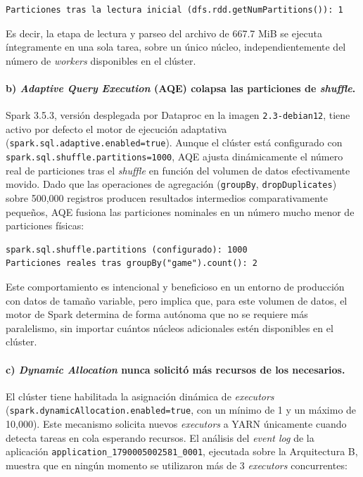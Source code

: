 \begin{lstlisting}[style=sh]
Particiones tras la lectura inicial (dfs.rdd.getNumPartitions()): 1
\end{lstlisting}

Es decir, la etapa de lectura y parseo del archivo de 667.7 MiB se ejecuta íntegramente en una sola tarea, sobre un único núcleo, independientemente del número de \textit{workers} disponibles en el clúster.

\paragraph{b) \textit{Adaptive Query Execution} (AQE) colapsa las particiones de \textit{shuffle}.}
Spark 3.5.3, versión desplegada por Dataproc en la imagen \texttt{2.3-debian12}, tiene activo por defecto el motor de ejecución adaptativa (\texttt{spark.\bk{}sql.\bk{}adaptive.\bk{}enabled=\bk{}true}). Aunque el clúster está configurado con \texttt{spark.\bk{}sql.\bk{}shuffle.\bk{}partitions=\bk{}1000}, AQE ajusta dinámicamente el número real de particiones tras el \textit{shuffle} en función del volumen de datos efectivamente movido. Dado que las operaciones de agregación (\texttt{groupBy}, \texttt{dropDuplicates}) sobre 500,000 registros producen resultados intermedios comparativamente pequeños, AQE fusiona las particiones nominales en un número mucho menor de particiones físicas:

\begin{lstlisting}[style=sh]
spark.sql.shuffle.partitions (configurado): 1000
Particiones reales tras groupBy("game").count(): 2
\end{lstlisting}

Este comportamiento es intencional y beneficioso en un entorno de producción con datos de tamaño variable, pero implica que, para este volumen de datos, el motor de Spark determina de forma autónoma que no se requiere más paralelismo, sin importar cuántos núcleos adicionales estén disponibles en el clúster.

\paragraph{c) \textit{Dynamic Allocation} nunca solicitó más recursos de los necesarios.}
El clúster tiene habilitada la asignación dinámica de \textit{executors} (\texttt{spark.\bk{}dynamicAllocation.\bk{}enabled=\bk{}true}, con un mínimo de 1 y un máximo de 10,000). Este mecanismo solicita nuevos \textit{executors} a YARN únicamente cuando detecta tareas en cola esperando recursos. El análisis del \textit{event log} de la aplicación \texttt{application\_\bk{}1790005002581\_\bk{}0001}, ejecutada sobre la Arquitectura B, muestra que en ningún momento se utilizaron más de 3 \textit{executors} concurrentes:

